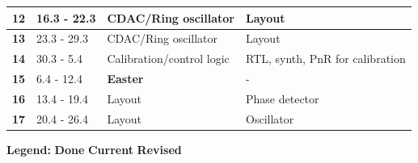 \documentclass[t, screen, aspectratio=43]{beamer}
\begin{document}
\begin{frame}
\begin{table}[htb!]
\begin{tabular}{|c|l|l|l|}
			\hline 
			\rule[-1ex]{0pt}{2.5ex}\cellcolor{green!40}\textbf{12}&\cellcolor{green!40}16.3 - 22.3&\cellcolor{green!40}CDAC/Ring oscillator  &\cellcolor{green!40}Layout\\ 
			\hline 
			\rule[-1ex]{0pt}{2.5ex}\textbf{13}&23.3 - 29.3&CDAC/Ring oscillator   & Layout\\ 
			\hline 
			\rule[-1ex]{0pt}{2.5ex}\textbf{14}& 30.3 - 5.4 &  Calibration/control logic & RTL, synth, PnR for calibration\\ 
			\hline 
			\rule[-1ex]{0pt}{2.5ex}\textbf{15}& 6.4 - 12.4& {\color{red}\textbf{Easter}} & - \\ 
			\hline 
			\rule[-1ex]{0pt}{2.5ex}\textbf{16}& 13.4 - 19.4& Layout & Phase detector\\ 
			\hline 
			\rule[-1ex]{0pt}{2.5ex}\textbf{17}& 20.4 - 26.4& Layout & Oscillator\\ 
			\hline 
		\end{tabular}
		\begin{flushleft}\textbf{Legend:} \colorbox{red!20}{\textbf{Done}} \colorbox{green!20}{\textbf{Current}}  \colorbox{blue!20}{\textbf{Revised}}
		\end{flushleft}
	\end{table}   
\end{frame}
\end{document}
